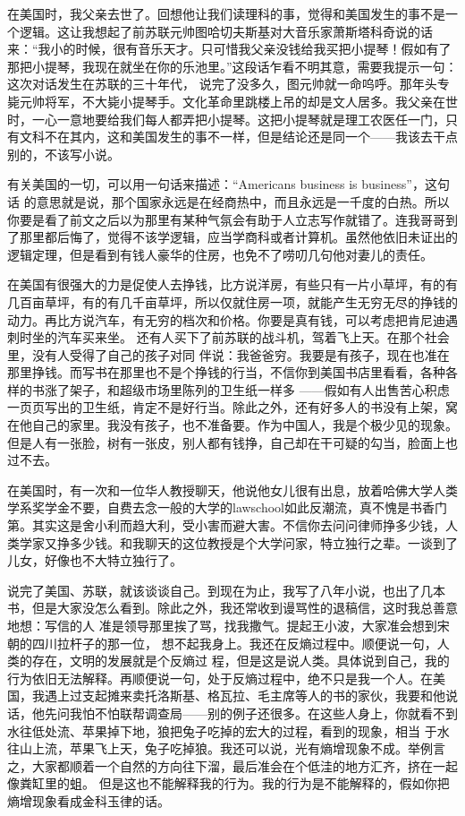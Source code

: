 在美国时，我父亲去世了。回想他让我们读理科的事，觉得和美国发生的事不是一个逻辑。这让我想起了前苏联元帅图哈切夫斯基对大音乐家萧斯塔科奇说的话来：“我小的时候，很有音乐天才。只可惜我父亲没钱给我买把小提琴！假如有了那把小提琴，我现在就坐在你的乐池里。”这段话乍看不明其意，需要我提示一句：这次对话发生在苏联的三十年代， 说完了没多久，图元帅就一命呜呼。那年头专毙元帅将军，不大毙小提琴手。文化革命里跳楼上吊的却是文人居多。我父亲在世时，一心一意地要给我们每人都弄把小提琴。这把小提琴就是理工农医任一门，只有文科不在其内，这和美国发生的事不一样，但是结论还是同一个——我该去干点别的，不该写小说。 

有关美国的一切，可以用一句话来描述：“Americans business is business”，这句话 的意思就是说，那个国家永远是在经商热中，而且永远是一千度的白热。所以你要是看了前文之后以为那里有某种气氛会有助于人立志写作就错了。连我哥哥到了那里都后悔了，觉得不该学逻辑，应当学商科或者计算机。虽然他依旧未证出的逻辑定理，但是看到有钱人豪华的住房，也免不了唠叨几句他对妻儿的责任。 

在美国有很强大的力是促使人去挣钱，比方说洋房，有些只有一片小草坪，有的有几百亩草坪，有的有几千亩草坪，所以仅就住房一项，就能产生无穷无尽的挣钱的动力。再比方说汽车，有无穷的档次和价格。你要是真有钱，可以考虑把肯尼迪遇刺时坐的汽车买来坐。 还有人买下了前苏联的战斗机，驾着飞上天。在那个社会里，没有人受得了自己的孩子对同 伴说：我爸爸穷。我要是有孩子，现在也准在那里挣钱。而写书在那里也不是个挣钱的行当，不信你到美国书店里看看，各种各样的书涨了架子，和超级市场里陈列的卫生纸一样多 ——假如有人出售苦心积虑一页页写出的卫生纸，肯定不是好行当。除此之外，还有好多人的书没有上架，窝在他自己的家里。我没有孩子，也不准备要。作为中国人，我是个极少见的现象。但是人有一张脸，树有一张皮，别人都有钱挣，自己却在干可疑的勾当，脸面上也过不去。 

在美国时，有一次和一位华人教授聊天，他说他女儿很有出息，放着哈佛大学人类学系奖学金不要，自费去念一般的大学的lawschool如此反潮流，真不愧是书香门第。其实这是舍小利而趋大利，受小害而避大害。不信你去问问律师挣多少钱，人类学家又挣多少钱。和我聊天的这位教授是个大学问家，特立独行之辈。一谈到了儿女，好像也不大特立独行了。 

说完了美国、苏联，就该谈谈自己。到现在为止，我写了八年小说，也出了几本书，但是大家没怎么看到。除此之外，我还常收到谩骂性的退稿信，这时我总善意地想：写信的人 准是领导那里挨了骂，找我撒气。提起王小波，大家准会想到宋朝的四川拉杆子的那一位， 想不起我身上。我还在反熵过程中。顺便说一句，人类的存在，文明的发展就是个反熵过 程，但是这是说人类。具体说到自己，我的行为依旧无法解释。再顺便说一句，处于反熵过程中，绝不只是我一个人。在美国，我遇上过支起摊来卖托洛斯基、格瓦拉、毛主席等人的书的家伙，我要和他说话，他先问我怕不怕联帮调查局——别的例子还很多。在这些人身上，你就看不到水往低处流、苹果掉下地，狼把兔子吃掉的宏大的过程，看到的现象，相当 于水往山上流，苹果飞上天，兔子吃掉狼。我还可以说，光有熵增现象不成。举例言之，大家都顺着一个自然的方向往下溜，最后准会在个低洼的地方汇齐，挤在一起像粪缸里的蛆。 但是这也不能解释我的行为。我的行为是不能解释的，假如你把熵增现象看成金科玉律的话。 

